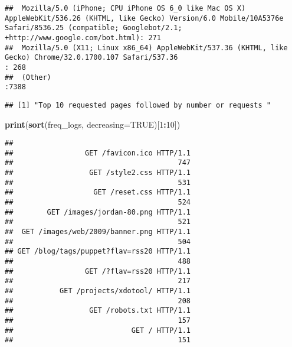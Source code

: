 \documentclass[]{article}
\newenvironment{Shaded}{\begin{snugshade}}{\end{snugshade}}
\newcommand{\DataTypeTok}[1]{\textcolor[rgb]{0.13,0.29,0.53}{#1}}
\newcommand{\DecValTok}[1]{\textcolor[rgb]{0.00,0.00,0.81}{#1}}
\newcommand{\KeywordTok}[1]{\textcolor[rgb]{0.13,0.29,0.53}{\textbf{#1}}}
\newcommand{\NormalTok}[1]{#1}
\newcommand{\OperatorTok}[1]{\textcolor[rgb]{0.81,0.36,0.00}{\textbf{#1}}}
\newcommand{\OtherTok}[1]{\textcolor[rgb]{0.56,0.35,0.01}{#1}}
\newcommand{\StringTok}[1]{\textcolor[rgb]{0.31,0.60,0.02}{#1}}
\begin{document}
\begin{verbatim}
##  Mozilla/5.0 (iPhone; CPU iPhone OS 6_0 like Mac OS X) AppleWebKit/536.26 (KHTML, like Gecko) Version/6.0 Mobile/10A5376e Safari/8536.25 (compatible; Googlebot/2.1; +http://www.google.com/bot.html): 271  
##  Mozilla/5.0 (X11; Linux x86_64) AppleWebKit/537.36 (KHTML, like Gecko) Chrome/32.0.1700.107 Safari/537.36                                                                                           : 268  
##  (Other)                                                                                                                                                                                             :7388
\end{verbatim}

\begin{Shaded}
\end{Shaded}

\begin{verbatim}
## [1] "Top 10 requested pages followed by number or requests "
\end{verbatim}

\begin{Shaded}
\begin{Highlighting}[]
\KeywordTok{print}\NormalTok{(}\KeywordTok{sort}\NormalTok{(freq_logs, }\DataTypeTok{decreasing=}\OtherTok{TRUE}\NormalTok{)[}\DecValTok{1}\OperatorTok{:}\DecValTok{10}\NormalTok{])}
\end{Highlighting}
\end{Shaded}

\begin{verbatim}
## 
##                 GET /favicon.ico HTTP/1.1 
##                                       747 
##                  GET /style2.css HTTP/1.1 
##                                       531 
##                   GET /reset.css HTTP/1.1 
##                                       524 
##        GET /images/jordan-80.png HTTP/1.1 
##                                       521 
##  GET /images/web/2009/banner.png HTTP/1.1 
##                                       504 
## GET /blog/tags/puppet?flav=rss20 HTTP/1.1 
##                                       488 
##                 GET /?flav=rss20 HTTP/1.1 
##                                       217 
##           GET /projects/xdotool/ HTTP/1.1 
##                                       208 
##                  GET /robots.txt HTTP/1.1 
##                                       157 
##                            GET / HTTP/1.1 
##                                       151
\end{verbatim}
\end{document}
